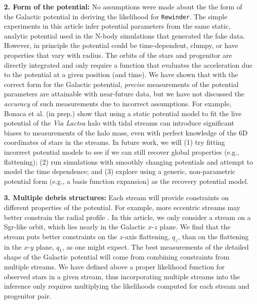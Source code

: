 \documentclass[letterpaper,12pt,preprint]{aastex}
\newcommand{\project}[1]{\textsl{#1}}
\newcommand{\rewinder}{\texttt{Rewinder}}
\begin{document}
{\bf 2. Form of the potential:} No assumptions were made about the the form of the Galactic potential in deriving the likelihood for \rewinder. The simple experiments in this article infer potential parameters from the same static, analytic potential used in the N-body simulations that generated the fake data. However, in principle the potential could be time-dependent, clumpy, or have properties that vary with radius. The orbits of the stars and progenitor are directly integrated and only require a function that evaluates the acceleration due to the potential at a given position (and time). We have shown that with the correct form for the Galactic potential, \emph{precise} measurements of the potential parameters are attainable with near-future data, but we have not discussed the \emph{accuracy} of such measurements due to incorrect assumptions. For example, Bonaca et al. (in prep.) show that using a static potential model to fit the live potential of the \project{Via Lactea} halo with tidal streams can introduce significant biases to measurements of the halo mass, even with perfect knowledge of the 6D coordinates of stars in the streams. In future work, we will (1) try fitting incorrect potential models to see if we can still recover global properties (e.g., flattening); (2) run simulations with smoothly changing potentials \citep[e.g.,][]{buist14} and attempt to model the time dependence; and (3) explore using a generic, non-parametric potential form (e.g., a basis function expansion) as the recovery potential model. 

{\bf 3. Multiple debris structures:} Each stream will provide constraints on different properties of the potential. For example, more eccentric streams may better constrain the radial profile \citep[see][who illustrate the power of using multiple streams to simultaneously constrain the potential using orbit fitting]{deg14}. In this article, we only consider a stream on a Sgr-like orbit, which lies nearly in the Galactic $x$-$z$ plane. We find that the stream puts better constraints on the $z$-axis flattening, $q_z$, than on the flattening in the $x$-$y$ plane, $q_1$, as one might expect. The best measurements of the detailed shape of the Galactic potential will come from combining constraints from multiple streams. We have defined above a proper likelihood function for observed stars in a given stream, thus incorporating multiple streams into the inference only requires multiplying the likelihoods computed for each stream and progenitor pair.
\end{document}
